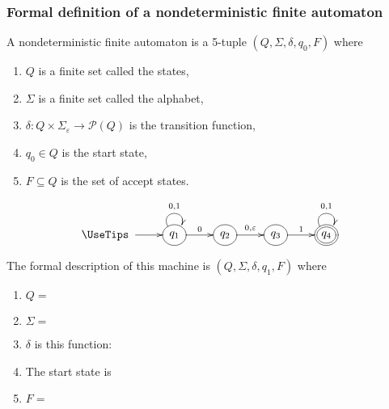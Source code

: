 \documentclass[xcolor=table]{beamer}
\begin{document}
\begin{frame}
  \frametitle{Formal definition of a nondeterministic finite automaton}

  \begin{Definition}
    A \alert{nondeterministic finite automaton} is a 5-tuple $(Q,\Sigma,
      \delta, q_0, F)$ where
      \begin{enumerate}
	\item $Q$ is a finite set called the \alert{states},
	\item $\Sigma$ is a finite set called the \alert{alphabet},
	\item $\delta: Q\times \Sigma_\varepsilon \rightarrow \mathcal{P}(Q)$ is the
	\alert{transition function},
	\item $q_0 \in Q$ is the \alert{start state},
	\item $F \subseteq Q$ is the \alert{set of accept states}.
      \end{enumerate}
      \end{Definition}

\end{frame}

\begin{frame}
  
  \[\UseTips
  \xymatrix {
      *+\txt{\ } \ar[r] & *++[o][F]{q_1} \ar@(ul,ur)^{0,1}
  \ar[r]^{0} & *++[o][F]{q_2} \ar[r]^{0,\varepsilon} & *++[o][F]{q_3}
  \ar[r]^{1} & *++[o][F=]{q_4} \ar@(ul,ur)^{0,1}
  }
  \]

  The formal description of this machine is $(Q,\Sigma,\delta,q_1,F)$
  where
  \begin{enumerate}
    \item $Q = $ 
    \item $\Sigma = $
    \item $\delta$ is this function:

    \item The start state is 
    \item $F = $ 
  \end{enumerate}
  
\end{frame}
\end{document}
